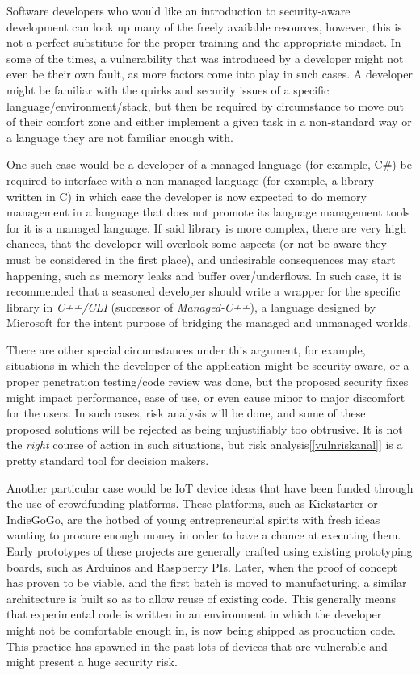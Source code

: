 \documentclass[a4paper,12pt]{article}
\begin{document}
	Software developers who would like an introduction to security-aware development can look up many of the freely available resources, however, this is not a perfect substitute for the proper training and the appropriate mindset. In some of the times, a vulnerability that was introduced by a developer might not even be their own fault, as more factors come into play in such cases. A developer might be familiar with the quirks and security issues of a specific language/environment/stack, but then be required by circumstance to move out of their comfort zone and either implement a given task in a non-standard way or a language they are not familiar enough with.
	
	One such case would be a developer of a managed language (for example, C\#) be required to interface with a non-managed language (for example, a library written in C) in which case the developer is now expected to do memory management in a language that does not promote its language management tools for it is a managed language. If said library is more complex, there are very high chances, that the developer will overlook some aspects (or not be aware they must be considered in the first place), and undesirable consequences may start happening, such as memory leaks and buffer over/underflows. In such case, it is recommended that a seasoned developer should write a wrapper for the specific library in \textit{C++/CLI} (successor of \textit{Managed-C++}), a language designed by Microsoft for the intent purpose\cite{hstutter06} of bridging the managed and unmanaged worlds.
	
	There are other special circumstances under this argument, for example, situations in which the developer of the application might be security-aware, or a proper penetration testing/code review was done, but the proposed security fixes might impact performance, ease of use, or even cause minor to major discomfort for the users. In such cases, risk analysis will be done, and some of these proposed solutions will be rejected as being unjustifiably too obtrusive. It is not the \textit{right} course of action in such situations, but risk analysis[\ref{vulnriskanal}] is a pretty standard tool for decision makers.
	
	Another particular case would be IoT device ideas that have been funded through the use of crowdfunding platforms. These platforms, such as Kickstarter or IndieGoGo, are the hotbed of young entrepreneurial spirits with fresh ideas wanting to procure enough money in order to have a chance at executing them. Early prototypes of these projects are generally crafted using existing prototyping boards, such as Arduinos and Raspberry PIs. Later, when the proof of concept has proven to be viable, and the first batch is moved to manufacturing, a similar architecture is built so as to allow reuse of existing code. This generally means that experimental code is written in an environment in which the developer might not be comfortable enough in, is now being shipped as production code. This practice has spawned in the past lots of devices that are vulnerable and might present a huge security risk.\cite{mstan14}
	
\end{document}
